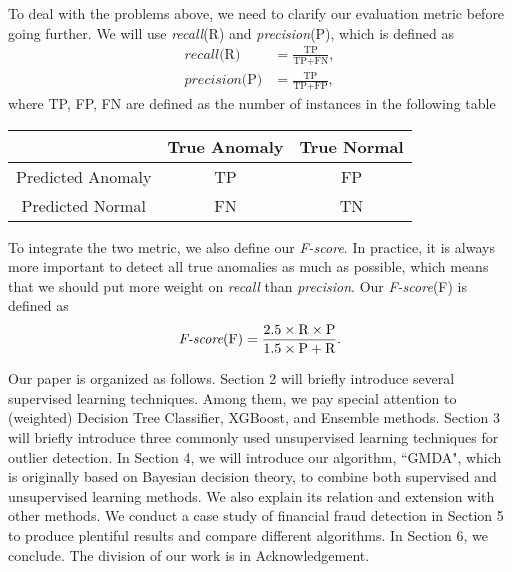 \documentclass[english]{article}
\newenvironment{eqt}{\begin{equation}\begin{aligned}}{\end{aligned}\end{equation}}
\begin{document}
\par To deal with the problems above, we need to clarify our evaluation metric before going further. We will use \textit{recall}(R) and \textit{precision}(P), which is defined as
\begin{eqt}
\textit{recall}\text{(R)} & = \frac{\text{TP}}{\text{TP}+\text{FN}},\\ 
\textit{precision}\text{(P)} & = \frac{\text{TP}}{\text{TP}+\text{FP}},
\end{eqt}
where TP, FP, FN are defined as the number of instances in the following table
\begin{table}[h]
	\centering
	\begin{tabular}{|c|c|c|}
		\hline
			& True Anomaly & True Normal\\
		\hline
			Predicted Anomaly & TP & FP\\
		\hline
			Predicted Normal & FN & TN\\
		\hline
	\end{tabular}
\end{table}
\par To integrate the two metric, we also define our \textit{F-score}. In practice, it is always more important to detect all true anomalies as much as possible, which means that we should put more weight on \textit{recall} than \textit{precision}. Our \textit{F-score}(F) is defined as
\begin{eqt}
\textit{F-score}\text{(F)} = \frac{2.5\times \text R\times \text P}{1.5\times \text P + \text R}.
\end{eqt}
\par Our paper is organized as follows. Section 2 will briefly introduce several supervised learning techniques. Among them, we pay special attention to (weighted) Decision Tree Classifier, XGBoost, and Ensemble methods. Section 3 will briefly introduce three commonly used unsupervised learning techniques for outlier detection. In Section 4, we will introduce our algorithm, ``GMDA", which is originally based on Bayesian decision theory, to combine both supervised and unsupervised learning methods. We also explain its relation and extension with other methods. We conduct a case study of financial fraud detection in Section 5 to produce plentiful results and compare different algorithms. In Section 6, we conclude. The division of our work is in Acknowledgement.
\end{document}
